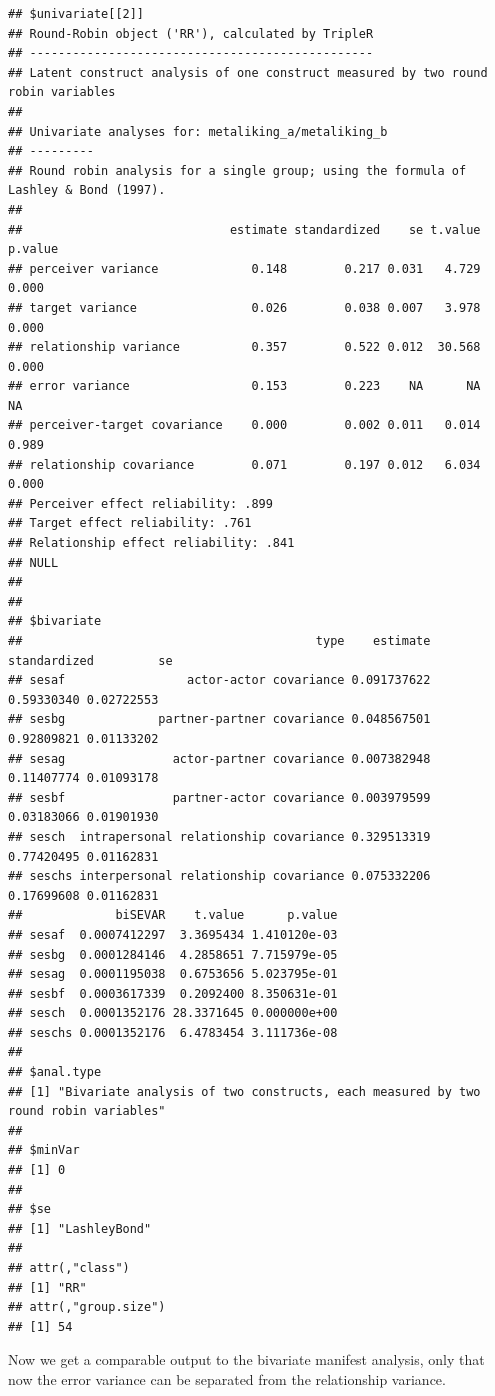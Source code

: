 \documentclass[a4paper]{article}\usepackage[]{graphicx}\usepackage[]{color}
\makeatletter
\newenvironment{kframe}{%
 \def\at@end@of@kframe{}%
 \ifinner\ifhmode%
  \def\at@end@of@kframe{\end{minipage}}%
  \begin{minipage}{\columnwidth}%
 \fi\fi%
 \def\FrameCommand##1{\hskip\@totalleftmargin \hskip-\fboxsep
 \colorbox{shadecolor}{##1}\hskip-\fboxsep
     \hskip-\linewidth \hskip-\@totalleftmargin \hskip\columnwidth}%
 \MakeFramed {\advance\hsize-\width
   \@totalleftmargin\z@ \linewidth\hsize
   \@setminipage}}%
 {\par\unskip\endMakeFramed%
 \at@end@of@kframe}
\newenvironment{knitrout}{}{} %
\makeatother
\begin{document}
\begin{knitrout}
\begin{kframe}
\begin{verbatim}
## $univariate[[2]]
## Round-Robin object ('RR'), calculated by TripleR
## ------------------------------------------------
## Latent construct analysis of one construct measured by two round robin variables
## 
## Univariate analyses for: metaliking_a/metaliking_b 
## ---------
## Round robin analysis for a single group; using the formula of Lashley & Bond (1997).
## 
##                             estimate standardized    se t.value p.value
## perceiver variance             0.148        0.217 0.031   4.729   0.000
## target variance                0.026        0.038 0.007   3.978   0.000
## relationship variance          0.357        0.522 0.012  30.568   0.000
## error variance                 0.153        0.223    NA      NA      NA
## perceiver-target covariance    0.000        0.002 0.011   0.014   0.989
## relationship covariance        0.071        0.197 0.012   6.034   0.000
## Perceiver effect reliability: .899 
## Target effect reliability: .761 
## Relationship effect reliability: .841 
## NULL
## 
## 
## $bivariate
##                                         type    estimate standardized         se
## sesaf                 actor-actor covariance 0.091737622   0.59330340 0.02722553
## sesbg             partner-partner covariance 0.048567501   0.92809821 0.01133202
## sesag               actor-partner covariance 0.007382948   0.11407774 0.01093178
## sesbf               partner-actor covariance 0.003979599   0.03183066 0.01901930
## sesch  intrapersonal relationship covariance 0.329513319   0.77420495 0.01162831
## seschs interpersonal relationship covariance 0.075332206   0.17699608 0.01162831
##             biSEVAR    t.value      p.value
## sesaf  0.0007412297  3.3695434 1.410120e-03
## sesbg  0.0001284146  4.2858651 7.715979e-05
## sesag  0.0001195038  0.6753656 5.023795e-01
## sesbf  0.0003617339  0.2092400 8.350631e-01
## sesch  0.0001352176 28.3371645 0.000000e+00
## seschs 0.0001352176  6.4783454 3.111736e-08
## 
## $anal.type
## [1] "Bivariate analysis of two constructs, each measured by two round robin variables"
## 
## $minVar
## [1] 0
## 
## $se
## [1] "LashleyBond"
## 
## attr(,"class")
## [1] "RR"
## attr(,"group.size")
## [1] 54
\end{verbatim}
\end{kframe}
\end{knitrout}

Now we get a comparable output to the bivariate manifest analysis, only that now the error variance can be separated from the relationship variance.
\end{document}
